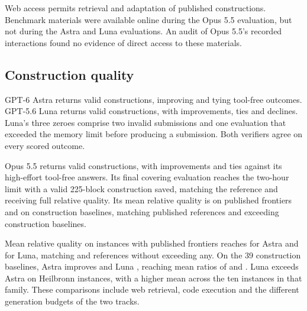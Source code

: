 Web access permits retrieval and adaptation of published constructions. Benchmark materials were available online during the Opus 5.5 evaluation, but not during the Astra and Luna evaluations. An audit of Opus 5.5's recorded interactions found no evidence of direct access to these materials.

\subsection{Construction quality}
GPT-6 Astra returns \ToolValid{} valid constructions, improving \ToolImproved{} and tying \ToolTied{} tool-free outcomes. GPT-5.6 Luna returns \LunaToolValid{} valid constructions, with \LunaToolImproved{} improvements, \LunaToolTied{} ties and \LunaToolDeclined{} declines. Luna's three zeroes comprise two invalid submissions and one evaluation that exceeded the memory limit before producing a submission. Both verifiers agree on every scored outcome.

Opus 5.5 returns \OpusToolValid{} valid constructions, with \OpusToolImproved{} improvements and \OpusToolTied{} ties against its high-effort tool-free answers. Its final covering evaluation reaches the two-hour limit with a valid 225-block construction saved, matching the reference and receiving full relative quality. Its mean relative quality is \OpusToolPublishedHFR{} on published frontiers and \OpusToolConstructionRatio{} on construction baselines, matching \OpusToolPublishedMatched{} published references and exceeding \OpusToolConstructionAbove{} construction baselines.

Mean relative quality on instances with published frontiers reaches \ToolPublishedHFR{} for Astra and \LunaToolPublishedHFR{} for Luna, matching \ToolPublishedMatched{} and \LunaToolPublishedMatched{} references without exceeding any. On the 39 construction baselines, Astra improves \ToolConstructionAbove{} and Luna \LunaToolConstructionAbove{}, reaching mean ratios of \ToolConstructionRatio{} and \LunaToolConstructionRatio{}. Luna exceeds Astra on \LunaToolBeatsAstra{} Heilbronn instances, with a higher mean across the ten instances in that family. These comparisons include web retrieval, code execution and the different generation budgets of the two tracks.

\begin{center}\small\setlength{\tabcolsep}{3pt}

\label{tab:tool_families}
\end{center}

